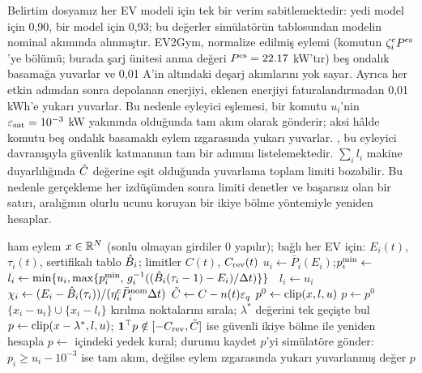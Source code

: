 Belirtim dosyamız her EV modeli için tek bir verim sabitlemektedir: yedi model için 0,90, bir model için 0,93; bu değerler simülatörün tablosundan modelin nominal akımında alınmıştır.
EV2Gym, normalize edilmiş eylemi (komutun $\zeta_i^{\mathrm c}P^{\mathrm{cs}}$'ye bölümü; burada şarj ünitesi anma değeri $P^{\mathrm{cs}}=22.17$ kW'tır) beş ondalık basamağa yuvarlar ve 0,01 A'in altındaki deşarj akımlarını yok sayar.
Ayrıca her etkin adımdan sonra depolanan enerjiyi, eklenen enerjiyi faturalandırmadan 0,01 kWh'e yukarı yuvarlar.
Bu nedenle eyleyici eşlemesi, bir komutu $u_i$'nin $\varepsilon_{\mathrm{sat}}=10^{-3}$ kW yakınında olduğunda tam akım olarak gönderir; aksi hâlde komutu beş ondalık basamaklı eylem ızgarasında yukarı yuvarlar.
, bu eyleyici davranışıyla güvenlik katmanının tam bir adımını listelemektedir.
$\sum_il_i$ makine duyarlılığında $\tilde C$ değerine eşit olduğunda yuvarlama toplam limiti bozabilir.
Bu nedenle gerçekleme her izdüşümden sonra limiti denetler ve başarısız olan bir satırı, aralığının olurlu ucunu koruyan bir ikiye bölme yöntemiyle yeniden hesaplar.

\begin{algorithm}[t]
\caption{Güvenlik katmanının bir adımı}\label{alg:safety}
\begin{algorithmic}[1]
\Require ham eylem $x\in\mathbb R^N$ (sonlu olmayan girdiler 0 yapılır); bağlı her EV için: $E_i(t)$, $\tau_i(t)$, sertifikalı tablo $\hat B_i$; limitler $C(t)$, $C_{\mathrm{rev}}(t)$
  \State $u_i\gets\bar P_i(E_i)$;\quad $p^{\min}_i\gets$ 
   $l_i\gets\min\{u_i,\max\{p^{\min}_i,\,g_i^{-1}((\hat B_i(\tau_i-1)-E_i)/\Delta t)\}\}$ \Else\ $l_i\gets u_i$ \EndIf
  \State $\chi_i\gets(E_i-\hat B_i(\tau_i))/(\eta_i^{\mathrm c}\bar P^{\mathrm{nom}}_i\Delta t)$
\EndFor
\State $\tilde C\gets C-n(t)\varepsilon_q$
 
  \State $p^{0}\gets\operatorname{clip}(x,l,u)$
   $p\gets p^{0}$
  \Else
    \State $\{x_i-u_i\}\cup\{x_i-l_i\}$ kırılma noktalarını sırala; $\lambda^{*}$ değerini tek geçişte bul
    \State $p\gets\operatorname{clip}(x-\lambda^{*},l,u)$; $\mathbf 1^\top p\notin[-C_{\mathrm{rev}},\tilde C]$ ise güvenli ikiye bölme ile yeniden hesapla
  \EndIf
\Else
  \State $p\gets$  içindeki yedek kural; durumu kaydet
\EndIf
\State $p$'yi simülatöre gönder: $p_i\ge u_i-10^{-3}$ ise tam akım, değilse eylem ızgarasında yukarı yuvarlanmış değer
\State \Return $p$
\end{algorithmic}
\end{algorithm}

